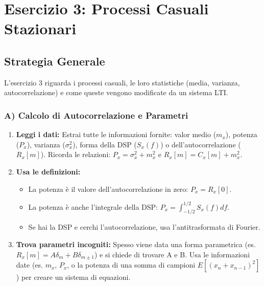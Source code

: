 \chapter{Esercizio 3: Processi Casuali Stazionari}

\section{Strategia Generale}
L'esercizio 3 riguarda i processi casuali, le loro statistiche (media, varianza, autocorrelazione) e come queste vengono modificate da un sistema LTI.

\subsection{A) Calcolo di Autocorrelazione e Parametri}
\begin{enumerate}
    \item \textbf{Leggi i dati:} Estrai tutte le informazioni fornite: valor medio ($m_x$), potenza ($P_x$), varianza ($\sigma_x^2$), forma della DSP ($S_x(f)$) o dell'autocorrelazione ($R_x[m]$). Ricorda le relazioni: $P_x = \sigma_x^2 + m_x^2$ e $R_x[m] = C_x[m] + m_x^2$.
    \item \textbf{Usa le definizioni:}
        \begin{itemize}
            \item La potenza è il valore dell'autocorrelazione in zero: $P_x = R_x[0]$.
            \item La potenza è anche l'integrale della DSP: $P_x = \int_{-1/2}^{1/2} S_x(f) df$.
            \item Se hai la DSP e cerchi l'autocorrelazione, usa l'antitrasformata di Fourier.
        \end{itemize}
    \item \textbf{Trova parametri incogniti:} Spesso viene data una forma parametrica (es. $R_x[m] = A\delta_m + B\delta_{m\pm1}$) e si chiede di trovare A e B. Usa le informazioni date (es. $m_x$, $P_x$, o la potenza di una somma di campioni $E[(x_n+x_{n-1})^2]$) per creare un sistema di equazioni.
\end{enumerate}

